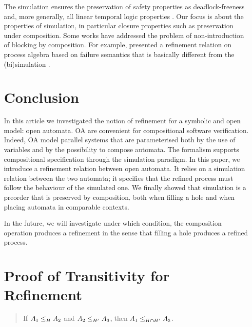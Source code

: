 \documentclass[runningheads]{llncs}
\begin{document}
The simulation  ensures the preservation of   
safety properties as deadlock-freeness  and, more generally, 
all linear temporal logic properties \cite{Manna:1992}  .  Our focus is about the properties of simulation, in particular closure properties such as preservation under composition. Some works   have addressed the problem of non-introduction of blocking by composition. For example,  \cite{DIHEGO2020110598}  presented a refinement relation on process algebra based on failure semantics that is basically different from the (bi)simulation \cite{10.5555/640428.640430}.    
  
 





\section{Conclusion}\label{sec:ccl}
In this article we investigated the notion of refinement for a symbolic and open model: open automata. 
OA are convenient for compositional software verification. Indeed, OA  model parallel systems that are parameterised both by the use of variables and by the possibility to compose automata. The formalism supports compositional specification through the simulation paradigm.
In this paper, we introduce a refinement relation  between open automata. It relies on a simulation relation between the two automata;  it  specifies that the refined process must follow the behaviour of the simulated one. We finally showed that simulation is a preorder that is preserved by composition, both when filling a hole and when placing automata in comparable contexts.

In the future, we will investigate under which condition, the composition operation produces a refinement in the sense that filling a hole produces a refined process.




 
 

\newpage

\appendix


\section{Proof of Transitivity for Refinement}\label{sec:proof-transitivity}
\begin{quote}
If $\wrel{A_1}{A_2}{H}$ and $\wrel{A_2}{A_3}{H'}$, then $\wrel{A_1}{A_3}{H\cap H'}$.
\end{quote}
\end{document}
